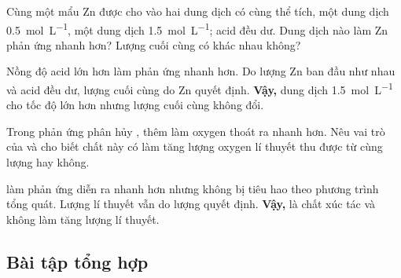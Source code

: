 \begin{tuluyen}
Cùng một mẩu Zn được cho vào hai dung dịch  có cùng thể tích, một dung dịch \SI{0.5}{\mole\per\liter}, một dung dịch \SI{1.5}{\mole\per\liter}; acid đều dư. Dung dịch nào làm Zn phản ứng nhanh hơn? Lượng  cuối cùng có khác nhau không?
\begin{loigiaiBT}
Nồng độ acid lớn hơn làm phản ứng nhanh hơn. Do lượng Zn ban đầu như nhau và acid đều dư, lượng  cuối cùng do Zn quyết định.
\textbf{Vậy,} dung dịch \SI{1.5}{\mole\per\liter} cho tốc độ lớn hơn nhưng lượng  cuối cùng không đổi.
\end{loigiaiBT}
\end{tuluyen}

\begin{tuluyen}
Trong phản ứng phân hủy , thêm  làm oxygen thoát ra nhanh hơn. Nêu vai trò của  và cho biết chất này có làm tăng lượng oxygen lí thuyết thu được từ cùng lượng  hay không.
\begin{loigiaiBT}
 làm phản ứng diễn ra nhanh hơn nhưng không bị tiêu hao theo phương trình tổng quát. Lượng  lí thuyết vẫn do lượng  quyết định.
\textbf{Vậy,}  là chất xúc tác và không làm tăng lượng  lí thuyết.
\end{loigiaiBT}
\end{tuluyen}

\subsection{Bài tập tổng hợp}



